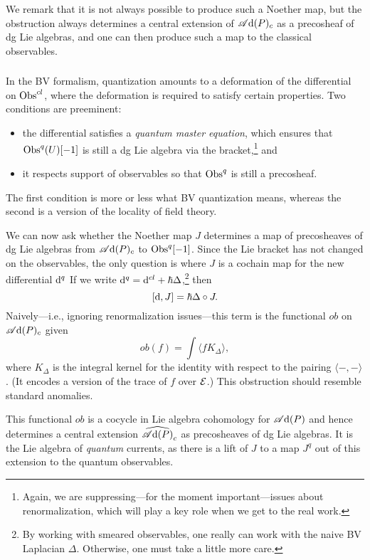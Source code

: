 \begin{rmk}
We remark that it is not always possible to produce such a Noether map,
but the obstruction always determines a central extension of $\mathscr A{\rm d}(P)_c$ as a precosheaf of dg Lie algebras,
and one can then produce such a map to the classical observables.
\end{rmk}

\subsubsection{}

In the BV formalism, quantization amounts to a deformation of the differential on ${\rm Obs}^{cl}$,
where the deformation is required to satisfy certain properties.
Two conditions are preeminent:
\begin{itemize}
\item the differential satisfies a {\em quantum master equation}, which ensures that ${\rm Obs}^q(U)[-1]$ is still a dg Lie algebra via the bracket,\footnote{Again, we are suppressing---for the moment important---issues about renormalization, which will play a key role when we get to the real work.} and
\item it respects support of observables so that ${\rm Obs}^q$ is still a precosheaf.
\end{itemize}
The first condition is more or less what  BV quantization means, 
whereas the second is a version of the locality of field theory.

We can now ask whether the Noether map $J$ determines a map of precosheaves of dg Lie algebras from $\mathscr A{\rm d}(P)_c$ to ${\rm Obs}^q[-1]$.
Since the Lie bracket has not changed on the observables, 
the only question is where $J$ is a cochain map for the new differential ${\rm d}^q$
If we write ${\rm d}^q = {\rm d}^{cl} + \hbar \Delta$,\footnote{By working with smeared observables, one really can work with the naive BV Laplacian $\Delta$. Otherwise, one must take a little more care.} then 
\[
[{\rm d},J] = \hbar \Delta \circ J.
\]
Naively---i.e., ignoring renormalization issues---this term is the functional $ob$ on $\mathscr A{\rm d}(P)_c$ given 
\[
ob(f) = \int \langle f K_\Delta \rangle,
\]
where $K_\Delta$ is the integral kernel for the identity with respect to the pairing $\langle-,-\rangle$.
(It encodes a version of the trace of $f$ over $\mathcal E$.)
This obstruction should resemble standard anomalies.

This functional $ob$ is a cocycle in Lie algebra cohomology for $\mathscr A{\rm d}(P)$ and hence determines a central extension $\widehat{\mathscr A{\rm d}(P)}_c$ as precosheaves of dg Lie algebras.
It is the Lie algebra of {\em quantum} currents, as there is a lift of $J$ to a map $J^q$ out of this extension to the quantum observables.
